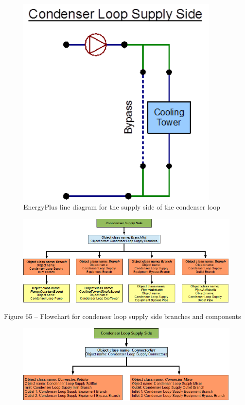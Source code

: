 \begin{figure}[hbtp] %
\centering
\includegraphics[width=0.9\textwidth, height=0.9\textheight, keepaspectratio=true]{media/image064.png}
\caption{EnergyPlus line diagram for the supply side of the condenser loop \protect \label{fig:energyplus-line-diagram-for-the-supply-side-001}}
\end{figure}

\begin{figure}[htbp]
\centering
\includegraphics{media/image065.png}
\caption{}
\end{figure}

Figure 65 -- Flowchart for condenser loop supply side branches and components

\begin{figure}[htbp]
\centering
\includegraphics{media/image066.png}
\caption{}
\end{figure}

